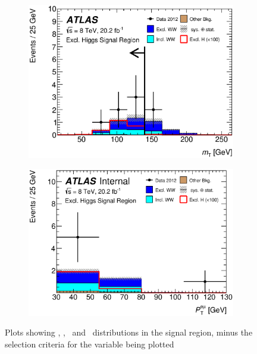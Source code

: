 \begin{figure}[!h]
\begin{subfigure}{0.5\textwidth}
   \includegraphics[width=\textwidth]{figures/emme_CutSR_MT_nMinus1_MTexcl.eps}
\end{subfigure} 
\begin{subfigure}{0.5\textwidth}
   \includegraphics[width=\textwidth]{figures/emme_CutSR_Ptll_nMinus1_PtllnMinusOne_130.eps}
\end{subfigure} 
\caption{Plots showing \memu, \dFem, \mT\ and \pTemu\ distributions in the signal region, minus the selection criteria for the variable 
being plotted}
\label{fig:exclHsr}
\end{figure}


